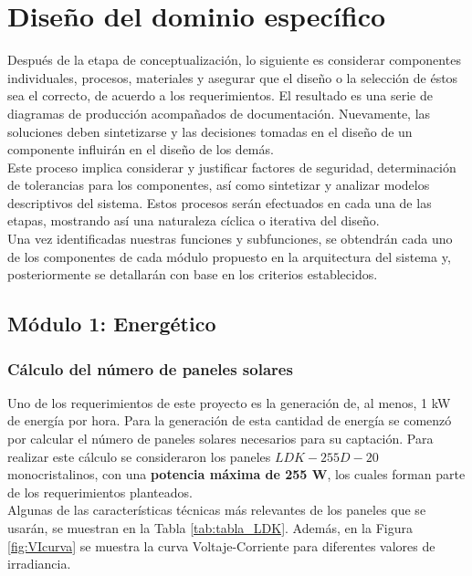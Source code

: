 \section{Diseño del dominio específico}
Después de la etapa de conceptualización, lo siguiente es considerar componentes individuales, procesos, materiales y asegurar que el diseño o la selección de éstos sea el correcto, de acuerdo a los requerimientos. El resultado es una serie de diagramas de producción acompañados de documentación. Nuevamente, las soluciones deben sintetizarse y las decisiones tomadas en el diseño de un componente influirán en el diseño de los demás. \\

Este proceso implica considerar y justificar factores de seguridad, determinación de tolerancias para los componentes, así como sintetizar y analizar modelos descriptivos del sistema. Estos procesos serán efectuados en cada una de las etapas, mostrando así una naturaleza cíclica o iterativa del diseño. \\

Una vez identificadas nuestras funciones y subfunciones, se obtendrán cada uno de los componentes de cada módulo propuesto en la arquitectura del sistema y, posteriormente se detallarán con base en los criterios establecidos.


\subsection{Módulo 1: Energético}

\subsubsection{Cálculo del número de paneles solares}
Uno de los requerimientos de este proyecto es la generación de, al menos, 1 kW de energía por hora. Para la generación de esta cantidad de energía se comenzó por calcular el número de paneles solares necesarios para su captación. Para realizar este cálculo se consideraron los paneles $ LDK-255D-20 $ monocristalinos, con una \textbf{potencia máxima de 255 W}, los cuales forman parte de los requerimientos planteados.\\

Algunas de las características técnicas más relevantes de los paneles que se usarán, se muestran en la Tabla \ref{tab:tabla_LDK}. Además, en la Figura \ref{fig:VIcurva} se muestra la curva Voltaje-Corriente para diferentes valores de irradiancia.\\

